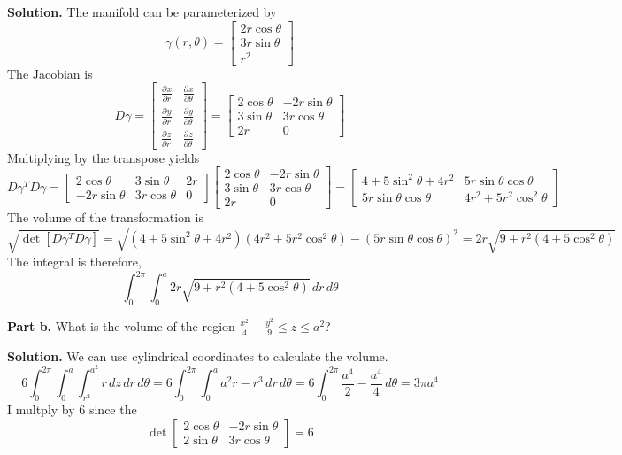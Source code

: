 \documentclass[12pt]{article}
\newcommand{\pder}[3][]{\frac{\partial^{#1} #2}{\partial #3^{#1}}}
\begin{document}
\textbf{Solution.}
The manifold can be parameterized by 
\[
  \gamma(r, \theta) = 
  \begin{bmatrix}
    2r\cos \theta \\
    3r\sin \theta \\
    r^2
  \end{bmatrix}
\]
The Jacobian is 
\[
  D\gamma = 
  \begin{bmatrix}
    \pder{x}{r} & \pder{x}{\theta} \\
    \pder{y}{r} & \pder{y}{\theta} \\
    \pder{z}{r} & \pder{z}{\theta}
  \end{bmatrix} =
  \begin{bmatrix}
    2\cos \theta & -2r\sin \theta \\
    3\sin \theta & 3r\cos \theta \\
    2r & 0
  \end{bmatrix} 
\]
Multiplying by the transpose yields 
\[
  D\gamma^TD\gamma = 
  \begin{bmatrix}
    2\cos \theta & 3\sin\theta & 2r \\
    -2r\sin\theta & 3r\cos\theta & 0
  \end{bmatrix} 
  \begin{bmatrix}
    2\cos \theta & -2r\sin \theta \\
    3\sin \theta & 3r\cos \theta \\
    2r & 0
  \end{bmatrix} =
  \begin{bmatrix}
    4 + 5\sin^2 \theta + 4r^2 & 5 r\sin\theta\cos\theta \\
    5 r\sin\theta\cos\theta & 4r^2 + 5r^2\cos^2 \theta 
  \end{bmatrix}
\]
The volume of the transformation is
\[
  \sqrt{\det[D\gamma^TD\gamma]}
  = \sqrt{(4 + 5\sin^2 \theta + 4r^2)(4r^2 + 5r^2\cos^2 \theta) - (5 r\sin\theta\cos\theta)^2}
  = 2r\sqrt{9 + r^2(4 + 5\cos^2 \theta)}
\]
The integral is therefore, 
\[
  \int_0^{2\pi} \int_0^a 2r\sqrt{9 + r^2(4 + 5\cos^2 \theta)} \,dr \,d\theta
\]
\bigskip

\noindent \textbf{Part b.}
What is the volume of the region $\frac{x^2}{4}+\frac{y^2}{9}\leq z\leq a^2$?
\medskip

\textbf{Solution.}
We can use cylindrical coordinates to calculate the volume.
\[
  6\int_0^{2\pi} \int_0^a \int_{r^2}^{a^2} r \,dz \,dr \,d\theta
  = 6\int_0^{2\pi} \int_0^a  a^2r-r^3 \,dr \,d\theta
  = 6\int_0^{2\pi} \frac{a^4}{2} - \frac{a^4}{4} \,d\theta
  = 3\pi a^4
\]
I multply by 6 since the
\[
  \det \begin{bmatrix}
    2\cos \theta & -2r\sin \theta \\
    2\sin \theta & 3r\cos \theta
  \end{bmatrix} = 6
\]
\newpage
\end{document}
